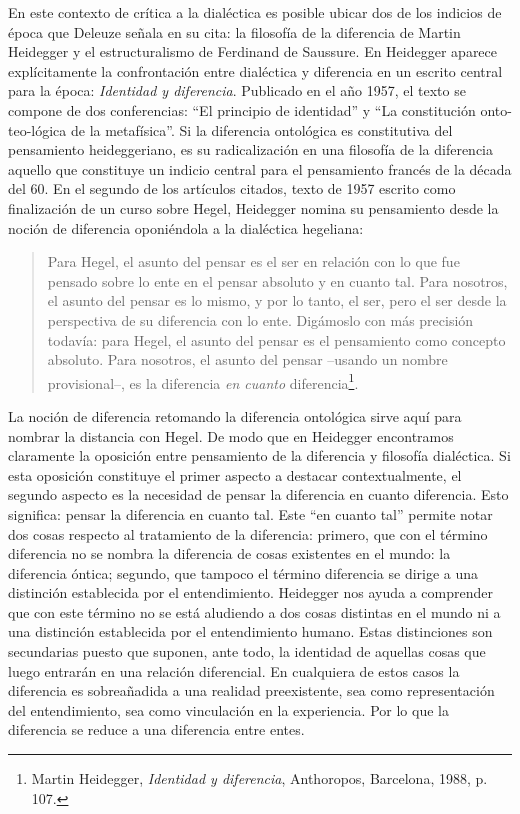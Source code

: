 \documentclass{book}
\begin{document}
En este contexto de crítica a la dialéctica es posible ubicar dos de los
indicios de época que Deleuze señala en su cita: la filosofía de la
diferencia de Martin Heidegger y el estructuralismo de Ferdinand de
Saussure. En Heidegger aparece explícitamente la confrontación entre
dialéctica y diferencia en un escrito central para la época:
\emph{Identidad y diferencia}. Publicado en el año 1957, el texto se
compone de dos conferencias: \enquote{El principio de identidad} y \enquote{La
constitución onto-teo-lógica de la metafísica}. Si la diferencia
ontológica es constitutiva del pensamiento heideggeriano, es su
radicalización en una filosofía de la diferencia aquello que constituye
un indicio central para el pensamiento francés de la década del 60. En
el segundo de los artículos citados, texto de 1957 escrito como
finalización de un curso sobre Hegel, Heidegger nomina su pensamiento
desde la noción de diferencia oponiéndola a la dialéctica hegeliana:

\begin{quote}
Para Hegel, el asunto del pensar es el ser en relación con lo que fue
pensado sobre lo ente en el pensar absoluto y en cuanto tal. Para
nosotros, el asunto del pensar es lo mismo, y por lo tanto, el ser, pero
el ser desde la perspectiva de su diferencia con lo ente. Digámoslo con
más precisión todavía: para Hegel, el asunto del pensar es el
pensamiento como concepto absoluto. Para nosotros, el asunto del pensar
--usando un nombre provisional--, es la diferencia \emph{en cuanto}
diferencia\footnote{Martin Heidegger, \emph{Identidad y diferencia},
  Anthoropos, Barcelona, 1988, p. 107.}.
\end{quote}

La noción de diferencia retomando la diferencia ontológica sirve aquí
para nombrar la distancia con Hegel. De modo que en Heidegger
encontramos claramente la oposición entre pensamiento de la diferencia y
filosofía dialéctica. Si esta oposición constituye el primer aspecto a
destacar contextualmente, el segundo aspecto es la necesidad de pensar
la diferencia en cuanto diferencia. Esto significa: pensar la diferencia
en cuanto tal. Este \enquote{en cuanto tal} permite notar dos cosas respecto al
tratamiento de la diferencia: primero, que con el término diferencia no
se nombra la diferencia de cosas existentes en el mundo: la diferencia
óntica; segundo, que tampoco el término diferencia se dirige a una
distinción establecida por el entendimiento. Heidegger nos ayuda a
comprender que con este término no se está aludiendo a dos cosas
distintas en el mundo ni a una distinción establecida por el
entendimiento humano. Estas distinciones son secundarias puesto que
suponen, ante todo, la identidad de aquellas cosas que luego entrarán en
una relación diferencial. En cualquiera de estos casos la diferencia es
sobreañadida a una realidad preexistente, sea como representación del
entendimiento, sea como vinculación en la experiencia. Por lo que la
diferencia se reduce a una diferencia entre entes.
\end{document}
